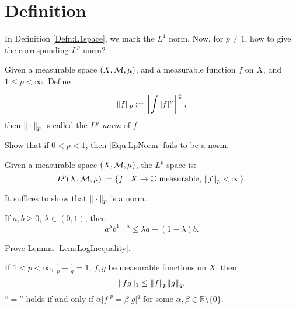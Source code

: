 \section{Definition}
\begin{rem}
    In Definition \ref{Defn:L1space}, we mark the 
    $L^{1}$ norm. Now, for $p\neq 1$, how to give the 
    corresponding $L^{p}$ norm?
\end{rem}
\begin{defn}
    Given a measurable space $(X,\mathcal{M},\mu)$, and a 
    measurable function $f$ on $X$, and $1\le p<\infty$. 
    Define 
    \begin{equation}
        \label{Equ:LpNorm}
        \|f\|_{p}:=\left[\int|f|^{p}\right]^{\frac{1}{p}}, 
    \end{equation}
    then $\|\cdot\|_{p}$ is called the 
    \textit{$L^{p}$-norm} of $f$.
\end{defn}
\begin{exc}
    Show that if $0<p<1$, then \eqref{Equ:LpNorm} fails to be  
    a norm.
\end{exc}
\begin{defn}[$L^{p}$-space]
    \label{Defn:LpSpace}
    Given a measurable space $(X,\mathcal{M},\mu)$, the $L^{p}$ space 
    is:
    \begin{displaymath}
        L^{p}(X,\mathcal{M},\mu):=\{f:X\rightarrow\mathbb{C}
        \text{ measurable, }\|f\|_{p}<\infty\}.
    \end{displaymath}
\end{defn}
\begin{rem}
    It suffices to show that $\|\cdot\|_{p}$ 
    is a norm.
\end{rem}
\begin{lem}
    \label{Lem:LogInequality}
    If $a,b\ge 0$, $\lambda\in(0,1)$, then 
    \begin{displaymath}
        a^{\lambda}b^{1-\lambda}\le\lambda a+(1-\lambda)b.
    \end{displaymath}
\end{lem}
\begin{exc}
    Prove Lemma \ref{Lem:LogInequality}.
\end{exc}
\begin{thm}
    \label{Thm:Holder}
    If $1<p<\infty$, $\frac{1}{p}+\frac{1}{q}=1$, 
    $f,g$ be measurable functions on $X$, then 
    \begin{equation}
        \label{Equ:HolderInequality}
        \|fg\|_{1}\le\|f\|_{p}\|g\|_{q}.
    \end{equation}
    ``$=$'' holds if and only if $\alpha|f|^{p}=\beta|g|^{q}$ 
    for some $\alpha,\beta\in\mathbb{R}\setminus\{0\}$.
\end{thm}
